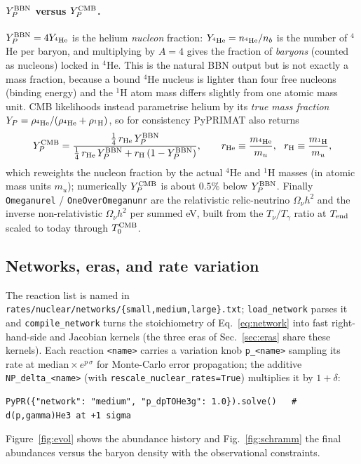 \documentclass[11pt,a4paper]{article}
\newcommand{\Tg}{T_\gamma}
\newcommand{\YP}{Y_P}
\newcommand{\code}[1]{\texttt{#1}}
\begin{document}
\paragraph{$\YP^{\rm BBN}$ versus $\YP^{\rm CMB}$.}
$\YP^{\rm BBN}=4Y_{^4{\rm He}}$ is the helium \emph{nucleon} fraction: $Y_{^4{\rm He}}=
n_{^4{\rm He}}/n_b$ is the number of $^4$He per baryon, and multiplying by $A=4$
gives the fraction of \emph{baryons} (counted as nucleons) locked in $^4$He.
This is the natural BBN output but is not exactly a mass fraction, because a
bound $^4$He nucleus is lighter than four free nucleons (binding energy) and the
$^1$H atom mass differs slightly from one atomic mass unit. CMB likelihoods
instead parametrise helium by its \emph{true mass fraction}
$Y_P=\rho_{^4{\rm He}}/(\rho_{^4{\rm He}}+\rho_{^1{\rm H}})$, so for consistency
PyPRIMAT also returns
\begin{equation}
  \YP^{\rm CMB}=\frac{\tfrac14\,r_{\rm He}\,\YP^{\rm BBN}}
                    {\tfrac14\,r_{\rm He}\,\YP^{\rm BBN}+r_{\rm H}\,(1-\YP^{\rm BBN})},
  \qquad r_{\rm He}\equiv\frac{m_{^4{\rm He}}}{m_u},\ \ r_{\rm H}\equiv\frac{m_{^1{\rm H}}}{m_u},
\end{equation}
which reweights the nucleon fraction by the actual $^4$He and $^1$H masses (in
atomic mass units $m_u$); numerically $\YP^{\rm CMB}$ is about $0.5\%$ below
$\YP^{\rm BBN}$. Finally \code{Omeganurel} / \code{OneOverOmeganunr} are the
relativistic relic-neutrino $\Omega_\nu h^2$ and the inverse non-relativistic
$\Omega_\nu h^2$ per summed eV, built from the $T_\nu/\Tg$ ratio at $T_{\rm end}$
scaled to today through $T_0^{\rm CMB}$.

\subsection{Networks, eras, and rate variation}
The reaction list is named in
\code{rates/nuclear/networks/\{small,medium,large\}.txt}; \code{load\_network}
parses it and \code{compile\_network} turns the stoichiometry of
Eq.~\eqref{eq:network} into fast right-hand-side and Jacobian kernels (the three
eras of Sec.~\ref{sec:eras} share these kernels).
Each reaction \code{<name>} carries a variation knob \code{p\_<name>} sampling
its rate at $\text{median}\times e^{p\,\sigma}$ for Monte-Carlo error
propagation; the additive \code{NP\_delta\_<name>} (with
\code{rescale\_nuclear\_rates=True}) multiplies it by $1+\delta$:
\begin{lstlisting}[style=py]
PyPR({"network": "medium", "p_dpTOHe3g": 1.0}).solve()   # d(p,gamma)He3 at +1 sigma
\end{lstlisting}
Figure~\ref{fig:evol} shows the abundance history and Fig.~\ref{fig:schramm} the
final abundances versus the baryon density with the observational constraints.
\end{document}

